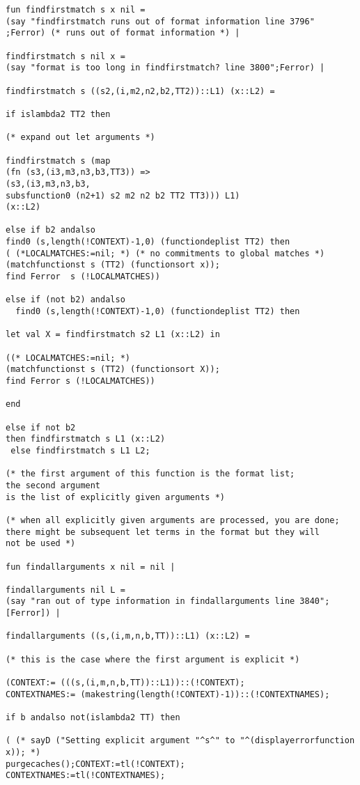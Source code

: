 \documentclass[12pt]{article}
\begin{document}
\begin{verbatim}
fun findfirstmatch s x nil = 
(say "findfirstmatch runs out of format information line 3796"
;Ferror) (* runs out of format information *) |

findfirstmatch s nil x = 
(say "format is too long in findfirstmatch? line 3800";Ferror) |

findfirstmatch s ((s2,(i,m2,n2,b2,TT2))::L1) (x::L2) =

if islambda2 TT2 then

(* expand out let arguments *)

findfirstmatch s (map
(fn (s3,(i3,m3,n3,b3,TT3)) =>
(s3,(i3,m3,n3,b3,
subsfunction0 (n2+1) s2 m2 n2 b2 TT2 TT3))) L1)
(x::L2)

else if b2 andalso 
find0 (s,length(!CONTEXT)-1,0) (functiondeplist TT2) then
( (*LOCALMATCHES:=nil; *) (* no commitments to global matches *)
(matchfunctionst s (TT2) (functionsort x));
find Ferror  s (!LOCALMATCHES))

else if (not b2) andalso 
  find0 (s,length(!CONTEXT)-1,0) (functiondeplist TT2) then

let val X = findfirstmatch s2 L1 (x::L2) in

((* LOCALMATCHES:=nil; *)
(matchfunctionst s (TT2) (functionsort X));
find Ferror s (!LOCALMATCHES))

end

else if not b2 
then findfirstmatch s L1 (x::L2) 
 else findfirstmatch s L1 L2;

(* the first argument of this function is the format list;  
the second argument
is the list of explicitly given arguments *)

(* when all explicitly given arguments are processed, you are done;
there might be subsequent let terms in the format but they will
not be used *)

fun findallarguments x nil = nil |

findallarguments nil L = 
(say "ran out of type information in findallarguments line 3840";
[Ferror]) |

findallarguments ((s,(i,m,n,b,TT))::L1) (x::L2) =

(* this is the case where the first argument is explicit *)

(CONTEXT:= (((s,(i,m,n,b,TT))::L1))::(!CONTEXT);
CONTEXTNAMES:= (makestring(length(!CONTEXT)-1))::(!CONTEXTNAMES);

if b andalso not(islambda2 TT) then 

( (* sayD ("Setting explicit argument "^s^" to "^(displayerrorfunction x)); *)
purgecaches();CONTEXT:=tl(!CONTEXT);
CONTEXTNAMES:=tl(!CONTEXTNAMES);


\end{verbatim}
\end{document}
